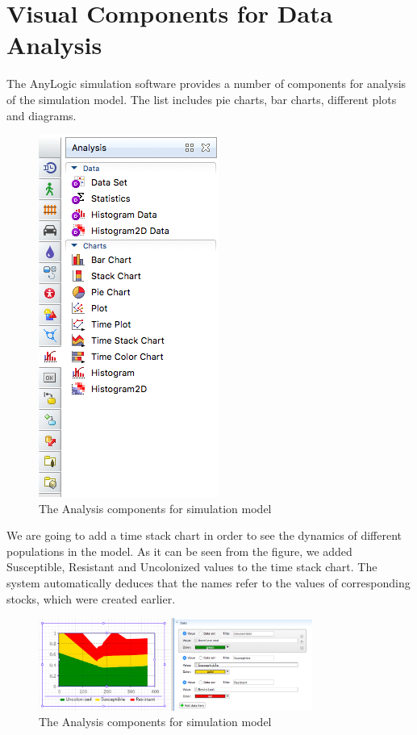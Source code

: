 \section{Visual Components for Data Analysis}

The AnyLogic simulation software provides a number of components for analysis of the simulation model. The list includes pie charts, bar charts, different plots and diagrams.

\begin{figure}[H]
  \centering
  \includegraphics[height=0.5\textwidth]{img/screens/charts/charts1}
  \caption{The Analysis components for simulation model}
\end{figure}

We are going to add a time stack chart in order to see the dynamics of different populations in the model. As it can be seen from the figure, we added Susceptible, Resistant and Uncolonized values to the time stack chart. The system automatically deduces that the names refer to the values of corresponding stocks, which were created earlier.

\begin{figure}[H]
  \centering
  \includegraphics[width=0.8\textwidth]{img/screens/charts/charts5}
  \caption{The Analysis components for simulation model}
\end{figure}
